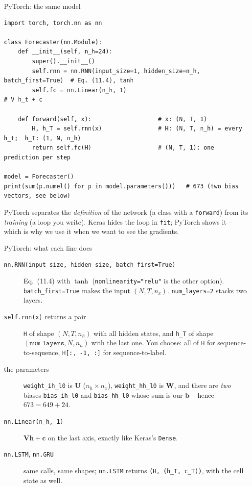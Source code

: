 \documentclass[10pt,aspectratio=169]{beamer}
\begin{document}
\begin{frame}[fragile]{PyTorch: the same model}
\begin{lstlisting}
import torch, torch.nn as nn

class Forecaster(nn.Module):
    def __init__(self, n_h=24):
        super().__init__()
        self.rnn = nn.RNN(input_size=1, hidden_size=n_h, batch_first=True)  # Eq. (11.4), tanh
        self.fc = nn.Linear(n_h, 1)                                         # V h_t + c

    def forward(self, x):                   # x: (N, T, 1)
        H, h_T = self.rnn(x)                # H: (N, T, n_h) = every h_t;  h_T: (1, N, n_h)
        return self.fc(H)                   # (N, T, 1): one prediction per step

model = Forecaster()
print(sum(p.numel() for p in model.parameters()))   # 673 (two bias vectors, see below)
\end{lstlisting}
\small
PyTorch separates the \emph{definition} of the network (a class with a
\texttt{forward}) from its \emph{training} (a loop you write).  Keras hides
the loop in \texttt{fit}; PyTorch shows it -- which is why we use it when we
want to see the gradients.
\end{frame}

\begin{frame}{PyTorch: what each line does}
\small
\begin{description}
  \item[\texttt{nn.RNN(input\_size, hidden\_size, batch\_first=True)}]
        Eq.~(11.4) with $\tanh$ (\texttt{nonlinearity="relu"} is the other
        option).  \texttt{batch\_first=True} makes the input $(N,T,n_x)$.
        \texttt{num\_layers=2} stacks two layers.
  \item[\texttt{self.rnn(x)} returns a pair] \texttt{H} of shape $(N,T,n_h)$
        with all hidden states, and \texttt{h\_T} of shape
        $(\texttt{num\_layers},N,n_h)$ with the last one.  You choose: all of
        \texttt{H} for sequence-to-sequence, \texttt{H[:, -1, :]} for
        sequence-to-label.
  \item[the parameters] \texttt{weight\_ih\_l0} is $\bm{U}$ ($n_h\times n_x$),
        \texttt{weight\_hh\_l0} is $\bm{W}$, and there are \emph{two} biases
        \texttt{bias\_ih\_l0} and \texttt{bias\_hh\_l0} whose sum is our
        $\bm{b}$ -- hence $673=649+24$.
  \item[\texttt{nn.Linear(n\_h, 1)}] $\bm{V}\bm{h}+\bm{c}$ on the last axis,
        exactly like Keras's \texttt{Dense}.
  \item[\texttt{nn.LSTM}, \texttt{nn.GRU}] same calls, same shapes;
        \texttt{nn.LSTM} returns \texttt{(H, (h\_T, c\_T))}, with the cell
        state as well.
\end{description}
\end{frame}
\end{document}
